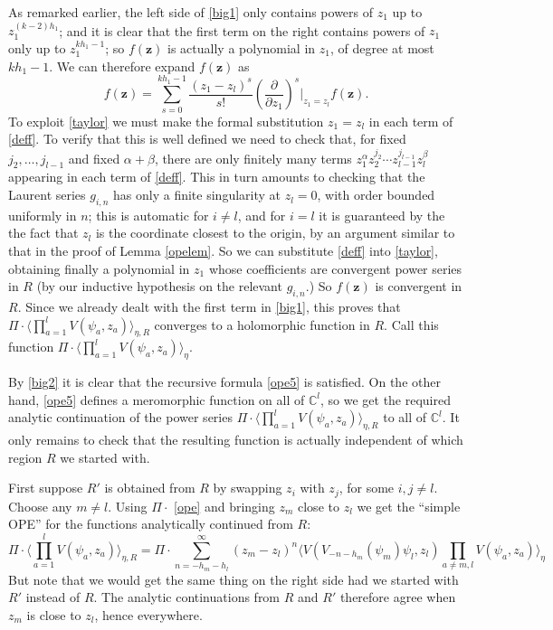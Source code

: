 \documentclass[a4paper,12pt]{article}
\newcommand{\C}{{\mathbb C}}
\newcommand{\zz}{{\mathbf z}}
\newcommand{\IP}[1]{\langle#1\rangle}
\newcommand{\dwrt}[1]{\frac{\partial}{\partial#1}}
\begin{document}
As remarked earlier, the left side of \eqref{big1}
only contains powers of $z_1$ up to $z_1^{(k-2)h_1}$; and it is clear that the first term on the right 
contains powers of $z_1$ only up to $z_1^{kh_1-1}$; so $f(\zz)$ is actually a polynomial in $z_1$,
of degree at most $kh_1 - 1$.  We can therefore expand $f(\zz)$ as
\begin{equation} \label{taylor}
f(\zz) = \sum_{s=0}^{kh_1-1} \frac{(z_1-z_l)^s}{s!} \left(\dwrt{z_1}\right)^s \Big\vert_{z_1 = z_l} f(\zz).
\end{equation}
To exploit \eqref{taylor} we must make the formal substitution $z_1 = z_l$ in each term of \eqref{deff}.  
To verify that this is well defined we need to check that, for
fixed $j_2, \dots, j_{l-1}$ and fixed $\alpha+\beta$, 
there are only finitely many terms $z_1^{\alpha} z_2^{j_2} \cdots z_{l-1}^{j_{l-1}} z_l^\beta$
appearing in each term of \eqref{deff}.  This in turn amounts to checking that the 
Laurent series $g_{i,n}$ has only a finite singularity at
 $z_l = 0$, with order bounded uniformly in $n$; this is automatic for $i \ne l$, and
for $i=l$ it is guaranteed by the
the fact that $z_l$ is the coordinate closest to the origin, by an argument similar
to that in the proof of Lemma \ref{opelem}.  So we can substitute \eqref{deff} into
\eqref{taylor}, obtaining finally a polynomial in $z_1$ whose coefficients are convergent power series in $R$
(by our inductive hypothesis on the relevant $g_{i,n}$.)  
So $f(\zz)$ is convergent in $R$.  Since we already dealt with the first term in \eqref{big1}, this
proves that $\Pi \cdot \IP{\prod_{a=1}^l V(\psi_a, z_a)}_{\eta,R}$ converges to a holomorphic function in $R$.
Call this function $\Pi \cdot \IP{\prod_{a=1}^l V(\psi_a, z_a)}_{\eta}$.

By \eqref{big2} it is clear that the recursive formula 
\eqref{ope5} is satisfied.  On the other hand, \eqref{ope5} defines a meromorphic function on all of $\C^l$,
so we get the required analytic continuation of the power series $\Pi \cdot \IP{\prod_{a=1}^l V(\psi_a, z_a)}_{\eta,R}$
to all of $\C^l$.  It only remains
to check that the resulting function is actually independent of which region $R$ we started with.

First suppose $R'$ is obtained from $R$ by swapping $z_i$ with $z_j$, for some $i,j \ne l$.  Choose any $m \ne l$.  Using
$\Pi \cdot$ \eqref{ope} and bringing $z_m$ close to $z_l$ we get the ``simple OPE'' for the functions analytically continued from $R$:
\begin{equation}
\Pi \cdot \IP{\prod_{a=1}^l V(\psi_a, z_a)}_{\eta,R} = \Pi \cdot \sum_{n = - h_m - h_l}^\infty (z_m - z_l)^{n} \IP{V(V_{-n-h_m}(\psi_m) \psi_l, z_l) \prod_{a \ne m,l} V(\psi_a, z_a)}_\eta
\end{equation}
But note that we would get the same thing on the right side had we started with $R'$ instead of $R$.  The analytic continuations from $R$ and $R'$ therefore
agree when $z_m$ is close to $z_l$, hence everywhere.
\end{document}
